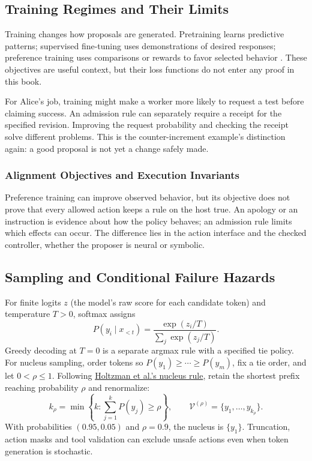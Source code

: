 \subsection{Training Regimes and Their Limits}

Training changes how proposals are generated. Pretraining learns predictive
patterns; supervised fine-tuning uses demonstrations of desired responses;
preference training uses comparisons or rewards to favor selected behavior
. These objectives are useful context,
but their loss functions do not enter any proof in this book.

For Alice's job, training might make a worker more likely to request a test
before claiming success. An admission rule can separately require a receipt
for the specified revision. Improving the request probability and checking the
receipt solve different problems. This is the counter-increment example's distinction
again: a good proposal is not yet a change safely made.


\subsubsection{Alignment Objectives and Execution Invariants}
Preference training can improve observed behavior, but its objective does not prove that every allowed action keeps a rule on the host true. An apology or an instruction is evidence about how the policy behaves; an admission rule limits which effects can occur. The difference lies in the action interface and the checked controller, whether the proposer is neural or symbolic.

\subsection{Sampling and Conditional Failure Hazards}

For finite logits $z$ (the model's raw score for each candidate token) and
temperature $T>0$, softmax assigns
\begin{equation}
P(y_i\mid x_{<t})=\frac{\exp(z_i/T)}{\sum_j\exp(z_j/T)}.
\end{equation}
Greedy decoding at $T=0$ is a separate argmax rule with a specified tie policy. For nucleus sampling, order tokens so $P(y_1)\ge\cdots\ge P(y_m)$, fix a tie order, and let $0<\rho\le1$. Following \href{https://arxiv.org/abs/1904.09751}{Holtzman et al.'s nucleus rule}, retain the shortest prefix reaching probability $\rho$ and renormalize:
\begin{equation}
k_\rho=\min\left\{k:\sum_{j=1}^{k}P(y_j)\ge \rho\right\},\qquad
\mathcal V^{(\rho)}=\{y_1,\ldots,y_{k_\rho}\}.
\end{equation}
With probabilities $(0.95,0.05)$ and $\rho=0.9$, the nucleus is $\{y_1\}$. Truncation, action masks and tool validation can exclude unsafe actions even when token generation is stochastic.

